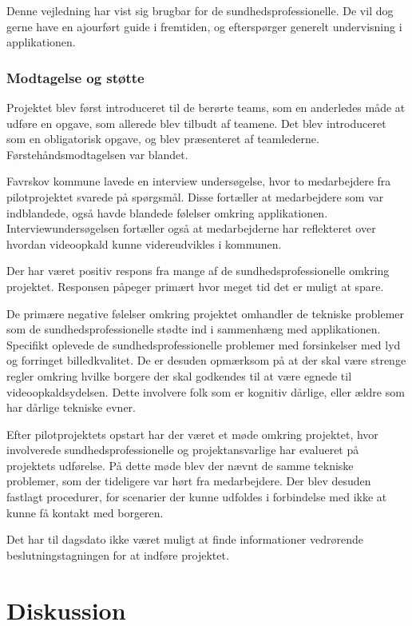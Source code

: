 Denne vejledning har vist sig brugbar for de sundhedsprofessionelle. De vil dog gerne have en ajourført guide i fremtiden, og efterspørger generelt undervisning i applikationen.

 
\subsubsection{Modtagelse og støtte}
Projektet blev først introduceret til de berørte teams, som en anderledes måde at udføre en opgave, som allerede blev tilbudt af teamene. Det blev introduceret som en obligatorisk opgave, og blev præsenteret af teamlederne. Førstehåndsmodtagelsen var blandet. 

Favrskov kommune lavede en interview undersøgelse, hvor to medarbejdere fra pilotprojektet svarede på spørgsmål. Disse fortæller at medarbejdere som var indblandede, også havde blandede følelser omkring applikationen. Interviewundersøgelsen fortæller også at medarbejderne har reflekteret over hvordan videoopkald kunne videreudvikles i kommunen. 

Der har været positiv respons fra mange af de sundhedsprofessionelle omkring projektet. Responsen påpeger primært hvor meget tid det er muligt at spare.

De primære negative følelser omkring projektet omhandler de tekniske problemer som de sundhedsprofessionelle stødte ind i sammenhæng med applikationen. Specifikt oplevede de sundhedsprofessionelle problemer med forsinkelser med lyd og forringet billedkvalitet. De er desuden opmærksom på at der skal være strenge regler omkring hvilke borgere der skal godkendes til at være egnede til videoopkaldsydelsen. Dette involvere folk som er kognitiv dårlige, eller ældre som har dårlige tekniske evner. 

Efter pilotprojektets opstart har der været et møde omkring projektet, hvor involverede sundhedsprofessionelle og projektansvarlige har evalueret på projektets udførelse. På dette møde blev der nævnt de samme tekniske problemer, som der tideligere var hørt fra medarbejdere. Der blev desuden fastlagt procedurer, for scenarier der kunne udfoldes i forbindelse med ikke at kunne få kontakt med borgeren. 

Det har til dagsdato ikke været muligt at finde informationer vedrørende beslutningstagningen for at indføre projektet.

  
\section{Diskussion}

